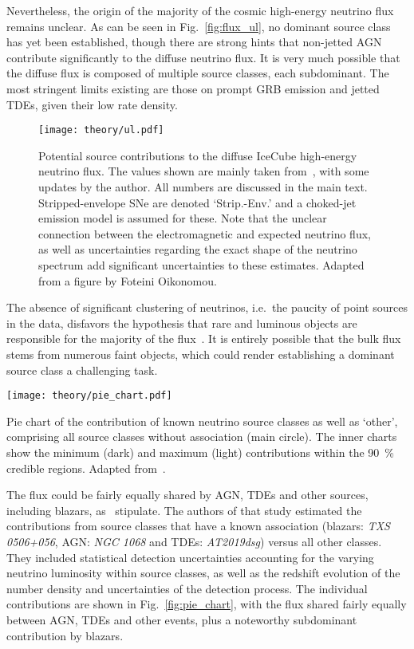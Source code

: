 Nevertheless, the origin of the majority of the cosmic high-energy neutrino flux remains unclear. As can be seen in Fig.~\ref{fig:flux_ul}, no dominant source class has yet been established, though there are strong hints that non-jetted AGN contribute significantly to the diffuse neutrino flux. It is very much possible that the diffuse flux is composed of multiple source classes, each subdominant. The most stringent limits existing are those on prompt GRB emission and jetted TDEs, given their low rate density.

\begin{figure}[htb]
    \texttt{[image: theory/ul.pdf]}
    \caption[Contribution to HE neutrino flux]{Potential source contributions to the diffuse IceCube high-energy neutrino flux. The values shown are mainly taken from~\cite{Guepin2022}, with some updates by the author. All numbers are discussed in the main text. Stripped-envelope SNe are denoted `Strip.-Env.' and a choked-jet emission model is assumed for these. Note that the unclear connection between the electromagnetic and expected neutrino flux, as well as uncertainties regarding the exact shape of the neutrino spectrum add significant uncertainties to these estimates. Adapted from a figure by Foteini Oikonomou.}
\end{figure}

The absence of significant clustering of neutrinos, i.e.~the paucity of point sources in the data, disfavors the hypothesis that rare and luminous objects are responsible for the majority of the flux~. It is entirely possible that the bulk flux stems from numerous faint objects, which could render establishing a dominant source class a challenging task.

\begin{marginfigure}
    \texttt{[image: theory/pie\_chart.pdf]}
    \caption[Neutrino flux contribution pie chart]{Pie chart of the contribution of known neutrino source classes as well as `other', comprising all source classes without association (main circle). The inner charts show the minimum (dark) and maximum (light) contributions within the \SI{90}{\percent} credible regions. Adapted from~\cite{Bartos2021}.}
\end{marginfigure}

The flux could be fairly equally shared by AGN, TDEs and other sources, including blazars, as~ stipulate. The authors of that study estimated the contributions from source classes that have a known association (blazars: \emph{TXS 0506+056}, AGN: \emph{NGC 1068} and TDEs: \emph{AT2019dsg}) versus all other classes. They included statistical detection uncertainties accounting for the varying neutrino luminosity within source classes, as well as the redshift evolution of the number density and uncertainties of the detection process. The individual contributions are shown in Fig.~\ref{fig:pie_chart}, with the flux shared fairly equally between AGN, TDEs and other events, plus a noteworthy subdominant contribution by blazars.

